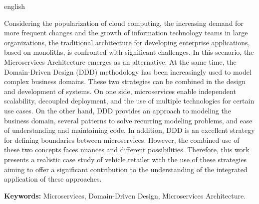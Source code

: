 \begin{resumo}[Abstract]
 \begin{otherlanguage*}{english}


Considering the popularization of cloud computing, the increasing demand for more frequent changes and the growth of information technology teams in large organizations, the traditional architecture for developing enterprise applications, based on monoliths, is confronted with significant challenges. In this scenario, the Microservices Architecture emerges as an alternative. At the same time, the Domain-Driven Design (DDD) methodology has been increasingly used to model complex business domains. These two strategies can be combined in the design and development of systems. On one side, microservices enable independent scalability, decoupled deployment, and the use of multiple technologies for certain use cases. On the other hand, DDD provides an approach to modeling the business domain, several patterns to solve recurring modeling problems, and ease of understanding and maintaining code. In addition, DDD is an excellent strategy for defining boundaries between microservices. However, the combined use of these two concepts faces nuances and different possibilities. Therefore, this work presents a realistic case study of vehicle retailer  with the use of these strategies aiming to offer a significant contribution to the understanding of the integrated application of these approaches.

\textbf{Keywords: } Microservices, Domain-Driven Design, Microservices Architecture.

\end{otherlanguage*}
\end{resumo}
